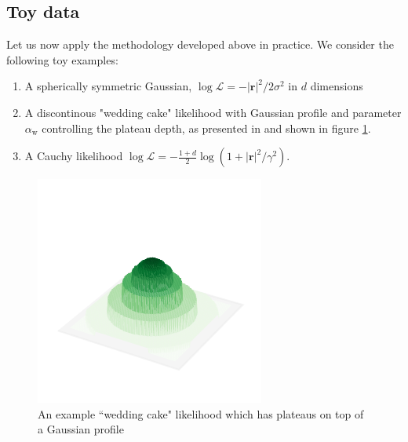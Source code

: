 \documentclass[usenatbib]{mnras}
\newcommand{\Like}{\mathcal{L}}
\begin{document}
\subsection{Toy data}
Let us now apply the methodology developed above in practice. We consider the following toy examples:
\begin{enumerate}[leftmargin=0.3in, label=(\alph*)]
	\item A spherically symmetric Gaussian, $\log \Like = -|\bm{r}|^2/2\sigma^2$ in $d$ dimensions
	\item A discontinous "wedding cake" likelihood with Gaussian profile and parameter $\alpha_\mathrm{w}$ controlling the plateau depth, as presented in \cite{plateaus} and shown in figure \ref{fig:wedding_3d}.
	\item A Cauchy likelihood $\log \Like = - \frac{1 + d}{2} \log (1 + |\bm{r}|^2/\gamma^2)$.
\end{enumerate}
\begin{figure}
\begin{center}
	\includegraphics{Figures/wedding_3d.pdf}
\end{center}
\caption{An example ``wedding cake" likelihood which has plateaus on top of a Gaussian profile}
\label{fig:wedding_3d}
\end{figure}
\end{document}
